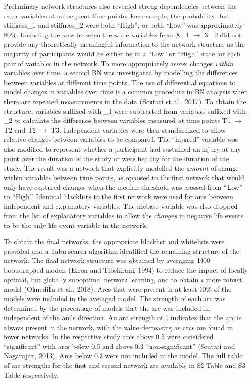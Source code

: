 \documentclass[utf8]{frontiersHLTH}
\begin{document}
Preliminary network structures also revealed strong dependencies between
the same variables at subsequent time points. For example, the
probability that stiffness\_1 and stiffness\_2 were both ``High'', or
both ``Low'' was approximately 80\%. Including the arcs between the same
variables from X\_1 \(\rightarrow\) X\_2 did not provide any
theoretically meaningful information to the network structure as the
majority of participants would be either be in a ``Low'' or ``High''
state for each pair of variables in the network. To more appropriately
assess changes \emph{within} variables over time, a second BN was
investigated by modelling the differences between variables at different
time points. The use of differential equations to model changes in
variables over time is a common procedure in BN analysis when there are
repeated measurements in the data (Scutari et al., 2017). To obtain the
structure, variables suffixed with \_1 were subtracted from variables
suffixed with \_2 to calculate the difference between variables measured
at time points T1 \(\rightarrow\) T2 and T2 \(\rightarrow\) T3.
Independent variables were then standardized to allow relative changes
between variables to be compared. The ``injured'' variable was also
modified to represent whether a participant had sustained an injury at
any point over the duration of the study or were healthy for the
duration of the study. The result was a network that explicitly modelled
the \emph{amount} of change within variables between time points, as
opposed to the first network that would only have captured changes when
the median threshold was crossed from ``Low'' to ``High''. Identical
blacklists to the first network were used for arcs between independent
and explanatory variables. The nlebase variable was also dropped from
the list of explanatory variables to allow the \emph{changes} in
negative life events to be the only life event variable in the network.

To obtain the final networks, the appropriate blacklist and whitelists
were provided and a Tabu search algorithm identified the remaining
structure of the network. The final network structure was obtained by
averaging 1000 bootstrapped models (Efron and Tibshirani, 1994) to
reduce the impact of locally optimal, but globally suboptimal network
learning, and to obtain a more robust model (Olmedilla et al., 2018).
Arcs that were present in at least 30\% of the models were included in
the averaged model. The strength of each arc was determined by the
percentage of models that the arc was included in, independent of the
arc's direction. An arc strength of 1 indicates that the arc is always
present in the network, with the value decreasing as arcs are found in
fewer networks. In the respective study arcs above 0.5 were considered
``significant'' with arcs below 0.5 and above 0.3 ``non-significant''
(Scutari and Nagarajan, 2013). Arcs below 0.3 were not included in the
model. The full table of arc strengths for the first and second network
are available in S2 Table and S3 Table respectively.
\end{document}
